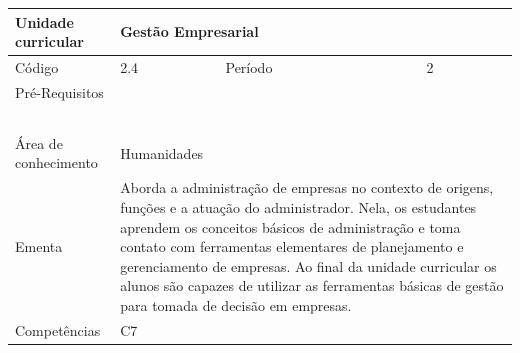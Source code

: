 \clearpage
\newpage

\begin{quadro}[ht!]
  \centering\scriptsize
\caption{Unidade Curricular Gestão Empresarial}

\begin{tabular}{|p{2.5cm}|p{2.5cm}|p{2.5cm}|p{2.5cm}|p{2.5cm}|}\hline

  Unidade curricular & \multicolumn{4}{p{10cm}|}{ Gestão Empresarial }\\\hline
  Código & 2.4 & Período & \multicolumn{2}{p{5cm}|}{ 2 }\\\hline
  Pré-Requisitos & \multicolumn{4}{p{10cm}|}{  } \\\hline
  \cellcolor{blue1}{ CH PRESENCIAL } &
    \cellcolor{blue1}{CH EAD Síncrona} &
    \cellcolor{blue1}{CH EAD Síncrona Mediada} &
    \cellcolor{blue1}{CH EAD Assíncrona} &
    \cellcolor{blue1}{CH APCC} \\\hline
  \cellcolor{blue1}{ 0 } &
    \cellcolor{blue1}{ 0 } &
    \cellcolor{blue1}{ 30 } &
    \cellcolor{blue1}{ 0 } &
    \cellcolor{blue1}{0} \\\hline
  \cellcolor{blue1}{ CH Teórica } &
    \cellcolor{blue1}{CH Prática} &
    \cellcolor{blue1}{CH Humanidades} &
    \cellcolor{blue1}{CH Extensão} &
    \cellcolor{blue1}{CH EAD TOTAL} \\\hline
  \cellcolor{blue1}{ 15 } &
    \cellcolor{blue1}{ 15 } &
    \cellcolor{blue1}{ 30 } &
    \cellcolor{blue1}{ 0 } &
    \cellcolor{blue1}{ 30 } \\\hline
  \cellcolor{blue1}{CARGA-HORÁRIA TOTAL} & \multicolumn{4}{p{10cm}|}{ \cellcolor{blue1}{ 30 } } \\\hline
  Área de conhecimento & \multicolumn{4}{p{10cm}|}{ Humanidades } \\\hline
  Ementa & \multicolumn{4}{p{10cm}|}{ Aborda a administração de empresas no contexto de origens, funções e a atuação do administrador. Nela, os estudantes aprendem os conceitos básicos de administração e toma contato com ferramentas elementares de planejamento e gerenciamento de empresas. Ao final da unidade curricular os alunos são capazes de utilizar as ferramentas básicas de gestão para tomada de decisão em empresas. } \\\hline
  Competências & \multicolumn{4}{p{10cm}|}{ C7 } \\\hline


  
	\end{tabular}

\end{quadro}


